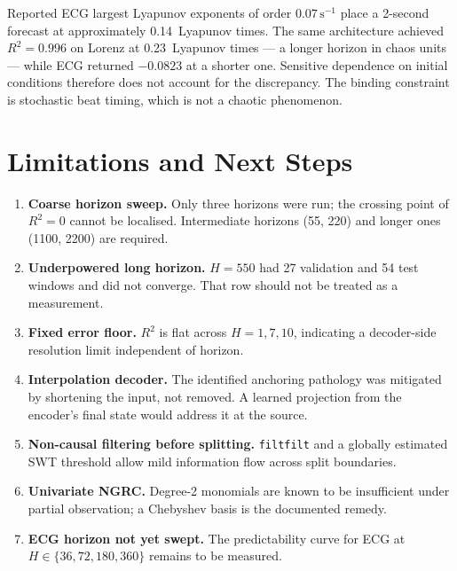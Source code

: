\documentclass[11pt,a4paper]{article}
\begin{document}
Reported ECG largest Lyapunov exponents of order $0.07\,\text{s}^{-1}$ place a 2-second forecast at approximately 0.14~Lyapunov times.
The same architecture achieved $R^2 = 0.996$ on Lorenz at 0.23~Lyapunov times --- a longer horizon in chaos units --- while ECG returned $-0.0823$ at a shorter one.
Sensitive dependence on initial conditions therefore does not account for the discrepancy.
The binding constraint is stochastic beat timing, which is not a chaotic phenomenon.


\section{Limitations and Next Steps}

\begin{enumerate}[leftmargin=*]
  \item \textbf{Coarse horizon sweep.} Only three horizons were run; the crossing point of $R^2 = 0$ cannot be localised. Intermediate horizons (55, 220) and longer ones (1100, 2200) are required.
  \item \textbf{Underpowered long horizon.} $H = 550$ had 27 validation and 54 test windows and did not converge. That row should not be treated as a measurement.
  \item \textbf{Fixed error floor.} $R^2$ is flat across $H = 1, 7, 10$, indicating a decoder-side resolution limit independent of horizon.
  \item \textbf{Interpolation decoder.} The identified anchoring pathology was mitigated by shortening the input, not removed. A learned projection from the encoder's final state would address it at the source.
  \item \textbf{Non-causal filtering before splitting.} \texttt{filtfilt} and a globally estimated SWT threshold allow mild information flow across split boundaries.
  \item \textbf{Univariate NGRC.} Degree-2 monomials are known to be insufficient under partial observation; a Chebyshev basis is the documented remedy.
  \item \textbf{ECG horizon not yet swept.} The predictability curve for ECG at $H \in \{36, 72, 180, 360\}$ remains to be measured.
\end{enumerate}
\end{document}

